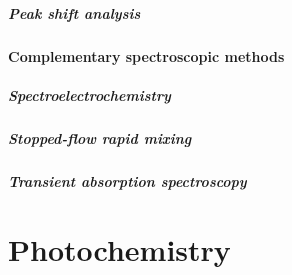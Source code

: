 \documentclass{article}
\numberwithin{theorem}{section}
\numberwithin{corollary}{section}
\numberwithin{postulate}{section}
\numberwithin{lemma}{section}
\numberwithin{definition}{section}
\begin{document}
\subsubsection{Peak shift analysis}

\subsection{Complementary spectroscopic methods}

\subsubsection{Spectroelectrochemistry}

\subsubsection{Stopped-flow rapid mixing}

\subsubsection{Transient absorption spectroscopy}

\part{Photochemistry}
\end{document}
